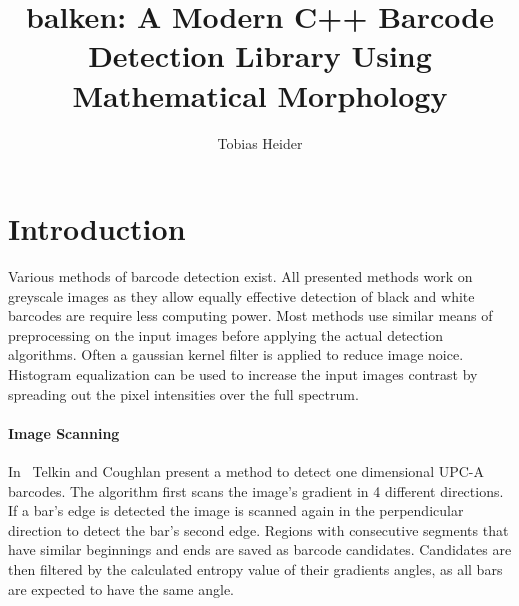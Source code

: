\documentclass[runningheads,a4paper]{llncs}
\begin{document}
\mainmatter  %

\title{balken: A Modern C++ Barcode Detection Library Using Mathematical Morphology}


%
\author{Tobias Heider}
%


\maketitle


\section{Introduction}

Various methods of barcode detection exist.
All presented methods work on greyscale images as they allow
equally effective detection of black and white barcodes are require less
computing power. Most methods use similar means of preprocessing on the input images
before applying the actual detection algorithms. Often a gaussian kernel filter
is applied to reduce image noice. Histogram equalization can be used to increase
the input images contrast by spreading out the pixel intensities over the full spectrum.

\paragraph{Image Scanning}
In~\cite{tekin2009algorithm} Telkin and Coughlan present a method to detect one
dimensional UPC-A barcodes.
The algorithm first scans the image's gradient in 4 different
directions. If a bar's edge is detected the image is scanned again in the
perpendicular direction to detect the bar's second edge. Regions with
consecutive segments that have similar beginnings and ends are saved as barcode
candidates. Candidates are then filtered by the calculated entropy value of
their gradients angles, as all bars are expected to have the same angle.
\end{document}
